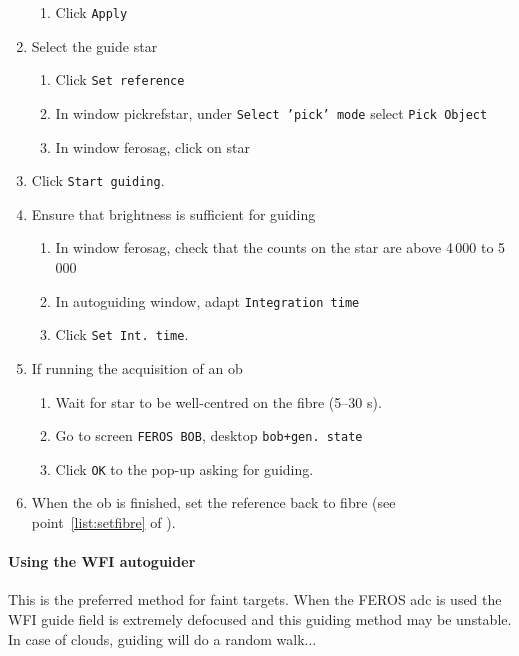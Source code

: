 \documentclass[11pt,fleqn,a4paper]{book}
\begin{document}
\begin{enumerate}
\begin{enumerate}
        \item Click \texttt{Apply}
    \end{enumerate}
    \item Select the guide star
    \begin{enumerate}
        \item Click \texttt{Set reference}
        \item In window \gls{pickrefstar}, under \texttt{Select 'pick' mode} select \texttt{Pick Object}
        \item In window \gls{ferosag}, click on star
    \end{enumerate} 
    \item Click \texttt{Start guiding}.
    \item Ensure that brightness is sufficient for guiding
    \begin{enumerate}
        \item In window \gls{ferosag}, check that the counts on the star are above 4\,000 to 5\,000
        \item In \gls{autoguiding} window, adapt \texttt{Integration time}
        \item Click \texttt{Set Int. time}. 
    \end{enumerate}
    \item If running the \gls{acquisition} of an \gls{ob}
    \begin{enumerate}
        \item Wait for star to be well-centred on the fibre (5--30 s).
        \item Go to screen \texttt{FEROS BOB}, \gls{desktop} \texttt{bob+gen. state}
        \item Click \texttt{OK} to the pop-up asking for guiding.
    \end{enumerate}
    \item When the \gls{ob} is finished, set the reference back to fibre
          (see point~\ref{list:setfibre} of ).
\end{enumerate}

\paragraph{Using the WFI autoguider}

This is the preferred method for faint targets.  When the FEROS \gls{adc} is used the WFI guide field is extremely defocused and this guiding method may be unstable.  In case of clouds, guiding will do a random walk...
\end{document}

